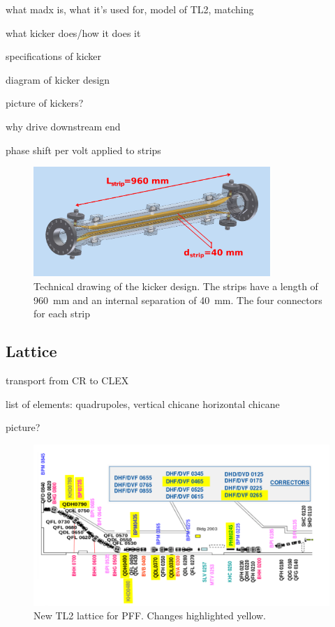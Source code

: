 what madx is, what it's used for, model of TL2, matching


what kicker does/how it does it

specifications of kicker

diagram of kicker design

picture of kickers?

why drive downstream end

phase shift per volt applied to strips

\begin{figure}
  \centering
  \includegraphics[width=0.8\textwidth]{Figures/optics/kickerSchematic}
  \caption{Technical drawing of the kicker design. The strips have a length of 960~mm and an internal separation of 40~mm. The four connectors for each strip}
  \label{f:kickerSchematic}
\end{figure}


\subsection{Lattice}
\label{ss:tl2Lattice}

transport from CR to CLEX

list of elements: quadrupoles, vertical chicane horizontal chicane

picture?

\begin{landscape}
\begin{figure}
  \centering
  \includegraphics[width=\hsize]{Figures/optics/newTL2Lattice}
  \caption{New TL2 lattice for PFF. Changes highlighted yellow.}
  \label{f:newTL2Lattice}
\end{figure}
\end{landscape}

